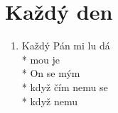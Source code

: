 \section{Každý den}
\begin{enumerate}
\item[] Každý  Pán mi lu dá \\*
 mou je   \\*
On se  mým  \\*
když čím  nemu se   \\*
když   nemu  
\end{enumerate}
